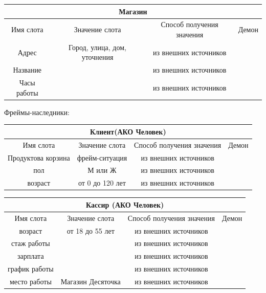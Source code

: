 \documentclass[14pt, a4paper, titlepage]{extarticle}
\begin{document}
\begin{table}[H]
\begin{adjustbox}{width=\columnwidth,center}
\begin{tabular}{cccc}
	\toprule
	\multicolumn{4}{c}{Магазин} \\
	\midrule
	Имя слота & Значение слота & Способ получения значения & Демон
	\\\midrule
	
	Адрес & Город, улица, дом, уточнения & из внешних источников & \\
	Название & & из внешних источников & \\
	Часы работы & & из внешних источников & \\
	\bottomrule
\end{tabular}
\end{adjustbox}
\end{table}

Фреймы-наследники:
\begin{table}[H]
	\begin{adjustbox}{width=\columnwidth,center}
		\begin{tabular}{cccc}
			\toprule
			\multicolumn{4}{c}{Клиент(АКО Человек)} \\
			\midrule
			Имя слота & Значение слота & Способ получения значения & Демон
			\\\midrule
			
			Продуктова корзина & фрейм-ситуация & из внешних источников & \\
			пол & М или Ж & из внешних источников & \\
			возраст & от 0 до 120 лет & из внешних источников & \\
			
			\bottomrule
		\end{tabular}
	\end{adjustbox}
\end{table}

\begin{table}[H]
	\begin{adjustbox}{width=\columnwidth,center}
		\begin{tabular}{cccc}
			\toprule
			\multicolumn{4}{c}{Кассир (АКО Человек)} \\
			\midrule
			Имя слота & Значение слота & Способ получения значения & Демон
			\\\midrule
			
			возраст & от 18 до 55 лет & из внешних источников & \\
			стаж работы & & из внешних источников & \\
			зарплата & & из внешних источников & \\
			график работы & & из внешних источников & \\
			место работы & Магазин Десяточка & из внешних источников & \\
			
			\bottomrule
		\end{tabular}
	\end{adjustbox}
\end{table}
\end{document}
